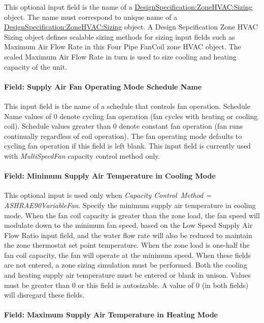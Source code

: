 This optional input field is the name of a \hyperref[designspecificationzonehvacsizing]{DesignSpecification:ZoneHVAC:Sizing} object. The name must correspond to unique name of a \hyperref[designspecificationzonehvacsizing]{DesignSpecification:ZoneHVAC:Sizing} object. A Design Sepcification Zone HVAC Sizing object defines scalable sizing methods for sizing input fields such as Maximum Air Flow Rate in this Four Pipe FanCoil zone HVAC object. The scaled Maximum Air Flow Rate in turn is used to size cooling and heating capacity of the unit.

\paragraph{Field: Supply Air Fan Operating Mode Schedule Name}\label{field-supply-air-fan-operating-mode-schedule-name-000}

This input field is the name of a schedule that controls fan operation. Schedule Name values of 0 denote cycling fan operation (fan cycles with heating or cooling coil). Schedule values greater than 0 denote constant fan operation (fan runs continually regardless of coil operation). The fan operating mode defaults to cycling fan operation if this field is left blank. This input field is currently used with \emph{MultiSpeedFan} capacity control method only.

\paragraph{Field: Minimum Supply Air Temperature in Cooling Mode}\label{field-minimum-supply-air-temperature-in-cooling-mode}

This optional input is used only when \emph{Capacity Control~Method = ASHRAE90VariableFan}. Specify the minimum supply air temperature in cooling mode. When the fan coil capacity is greater than the zone load, the fan speed will modulate down to the minimum fan speed, based on the Low Speed Supply Air Flow Ratio input field, and the water flow rate will also be reduced to maintain the zone thermostat set point temperature. When the zone load is one-half the fan coil capacity, the fan will operate at the minimum speed. When these fields are not entered, a zone sizing simulation must be performed. Both the cooling and heating supply air temperature must be entered or blank in unison. Values must be greater than 0 or this field is autosizable. A value of 0 (in both fields) will disregard these fields.

\paragraph{Field: Maximum Supply Air Temperature in Heating Mode}\label{field-maximum-supply-air-temperature-in-heating-mode}

